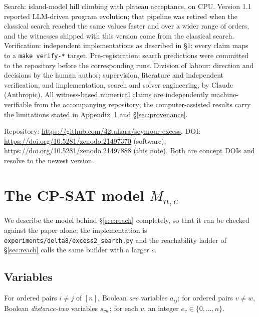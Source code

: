 \documentclass[11pt]{amsart}
\theoremstyle{remark}
\begin{document}
Search: island-model hill climbing with plateau acceptance, on CPU. Version
1.1 reported LLM-driven program evolution; that pipeline was retired when the
classical search reached the same values faster and over a wider range of
orders, and the witnesses shipped with this version come from the classical
search. Verification: independent implementations as described in \S1; every
claim maps to a \texttt{make verify-*} target. Pre-registration: search
predictions were committed to the repository before the corresponding runs.
Division of labour: direction and decisions by the human author; supervision,
literature and independent verification, and implementation, search and solver
engineering, by Claude (Anthropic). All witness-based numerical claims are
independently machine-verifiable from the accompanying repository; the
computer-assisted results carry the limitations stated in
Appendix~\ref{app:model} and \S\ref{sec:provenance}.

Repository: \url{https://github.com/42tahara/seymour-excess}.
DOI: \url{https://doi.org/10.5281/zenodo.21497370} (software);
\url{https://doi.org/10.5281/zenodo.21497888} (this note). Both are concept
DOIs and resolve to the newest version.

\appendix

\section{The CP-SAT model $M_{n,c}$}\label{app:model}

We describe the model behind \S\ref{sec:reach} completely, so that it can be
checked against the paper alone; the implementation is
\texttt{experiments/delta8/excess2\_search.py} and the reachability ladder of
\S\ref{sec:reach} calls the same builder with a larger $c$.

\subsection*{Variables}
For ordered pairs $i \ne j$ of $[n]$, Boolean \emph{arc} variables $a_{ij}$;
for ordered pairs $v \ne w$, Boolean \emph{distance-two} variables $s_{vw}$;
for each $v$, an integer $e_v \in \{0, \dots, n\}$.
\end{document}
